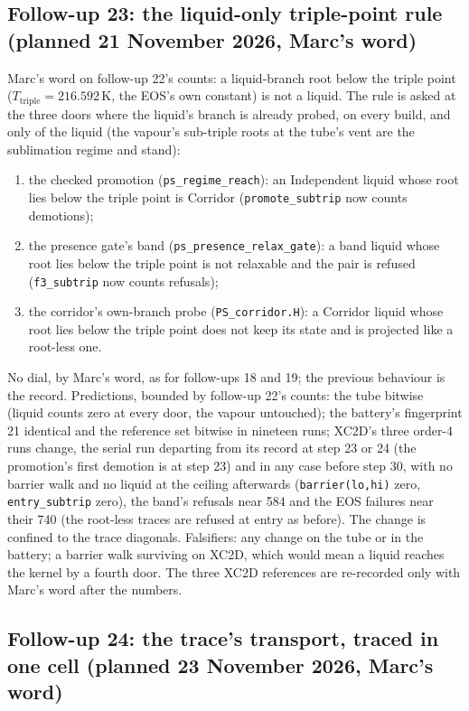 \documentclass[11pt,a4paper]{article}
\newcommand{\code}[1]{\texttt{\small #1}}
\begin{document}
\subsection*{Follow-up 23: the liquid-only triple-point rule (planned 21 November 2026, Marc's word)}

Marc's word on follow-up 22's counts: a liquid-branch root below the
triple point ($T_{\mathrm{triple}} = 216.592$\,K, the EOS's own
constant) is not a liquid.  The rule is asked at the three doors where
the liquid's branch is already probed, on every build, and only of the
liquid (the vapour's sub-triple roots at the tube's vent are the
sublimation regime and stand):
\begin{enumerate}[nosep]
\item the checked promotion (\code{ps\_regime\_reach}): an Independent
      liquid whose root lies below the triple point is Corridor
      (\code{promote\_subtrip} now counts demotions);
\item the presence gate's band (\code{ps\_presence\_relax\_gate}): a band
      liquid whose root lies below the triple point is not relaxable and
      the pair is refused (\code{f3\_subtrip} now counts refusals);
\item the corridor's own-branch probe (\code{PS\_corridor.H}): a
      Corridor liquid whose root lies below the triple point does not
      keep its state and is projected like a root-less one.
\end{enumerate}
No dial, by Marc's word, as for follow-ups 18 and 19; the previous
behaviour is the record.  Predictions, bounded by follow-up 22's
counts: the tube bitwise (liquid counts zero at every door, the
vapour untouched); the battery's fingerprint 21 identical and the
reference set bitwise in nineteen runs; XC2D's three order-4 runs
change, the serial run departing from its record at step 23 or 24
(the promotion's first demotion is at step 23) and in any case before
step 30, with no barrier walk and no liquid at the ceiling afterwards
(\code{barrier(lo,hi)} zero, \code{entry\_subtrip} zero), the band's
refusals near 584 and the EOS failures near their 740 (the root-less
traces are refused at entry as before).  The change is confined to the
trace diagonals.  Falsifiers: any change on the tube or in the
battery; a barrier walk surviving on XC2D, which would mean a liquid
reaches the kernel by a fourth door.  The three XC2D references are
re-recorded only with Marc's word after the numbers.

\subsection*{Follow-up 24: the trace's transport, traced in one cell (planned 23 November 2026, Marc's word)}
\end{document}
